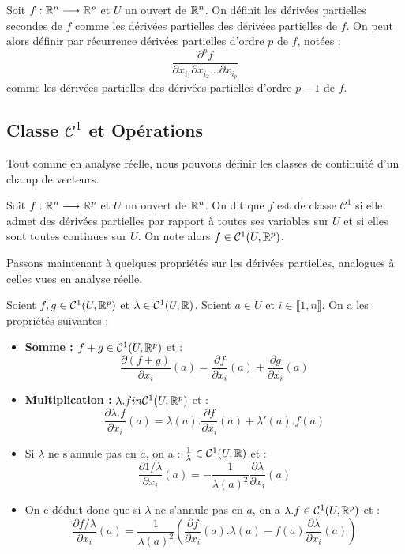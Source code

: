 \begin{definition}
    Soit $f : \mathbb{R}^n \longrightarrow \mathbb{R}^p$ et $U$ un ouvert de $\mathbb{R}^n$.
    On définit les dérivées partielles secondes de $f$ comme les dérivées partielles des dérivées partielles de $f$. 
    On peut alors définir par récurrence dérivées partielles d'ordre $p$ de $f$, notées : 
        \[ \frac{\partial ^p f}{\partial x_{i_1} \partial x_{i_2} \dots \partial x_{i_p}} \] 
    comme les dérivées partielles des dérivées partielles d'ordre $p-1$ de $f$. 
\end{definition}

\subsection{Classe $ \mathcal{C}^1$ et Opérations}

Tout comme en analyse réelle, nous pouvons définir les classes de continuité d'un champ de vecteurs. 

\begin{definition}
    Soit $f : \mathbb{R}^n \longrightarrow \mathbb{R}^p$ et $U$ un ouvert de $\mathbb{R}^n$.
    On dit que $f$ est de classe $ \mathcal{C}^1$ si elle admet des dérivées partielles par rapport à toutes ses variables 
    sur $U$ et si elles sont toutes continues sur $U$. 
    On note alors $f \in \mathcal{C}^1(U, \mathbb{R}^p)$. 
\end{definition}

Passons maintenant à quelques propriétés sur les dérivées partielles, analogues à celles vues en analyse réelle. 

\begin{prop}
    Soient $f,g \in \mathcal{C}^1(U, \mathbb{R}^p)$ et $ \lambda \in \mathcal{C}^1(U, \mathbb{R})$.
    Soient $a \in U$ et $ i \in \llbracket 1, n \rrbracket$. 
    On a les propriétés suivantes : 
    \begin{itemize}
        \item \textbf{Somme : } $f+g \in \mathcal{C}^1(U, \mathbb{R}^p)$ et :
            \[ \frac{\partial (f + g)}{\partial x_i} (a) = \frac{\partial f}{\partial x_i}(a) + \frac{\partial g}{\partial x_i}(a) \] 
        \item \textbf{Multiplication : } $ \lambda. f in \mathcal{C}^1(U, \mathbb{R}^p)$ et : 
            \[ \frac{\partial \lambda.f}{\partial x_i} (a) = \lambda(a) . \frac{\partial f}{\partial x_i} (a) + \lambda'(a) . f(a) \] 
        \item Si $\lambda$ ne s'annule pas en $a$, on a : $ \frac{1}{\lambda} \in \mathcal{C}^1(U, \mathbb{R})$ et : 
            \[ \frac{\partial 1/\lambda}{\partial x_i} (a) = - \frac{1}{\lambda(a)^2} \frac{\partial \lambda}{\partial x_i}(a) \] 
        \item On e déduit donc que si $\lambda$ ne s'annule pas en $a$, on a $\lambda.f \in \mathcal{C}^1(U, \mathbb{R}^p)$ et : 
            \[ \frac{\partial f/\lambda}{\partial x_i}(a) = \frac{1}{\lambda(a)^2} \left(\frac{\partial f}{\partial x_i}(a) . \lambda(a) - f(a) \frac{\partial \lambda}{\partial x_i}(a)\right) \] 
    \end{itemize}
\end{prop}

